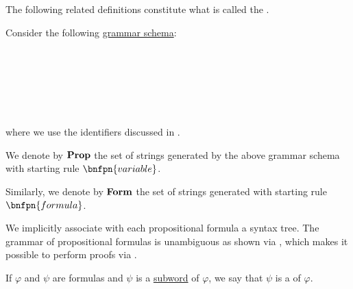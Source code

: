 \begin{definition}\label{def:propositional_syntax}\mimprovised
  The following related definitions constitute what is called the .

  \begin{thmenum}
     Consider the following \hyperref[rem:backus_normal_form]{grammar schema}:
    \begin{bnf*}
                 {} \\
               {\bnftsq{\( \synvee \)} \bnfor \bnftsq{\( \synwedge \)} \bnfor \bnftsq{\( \synimplies \)} \bnfor \bnftsq{\( \syniff \)}} \\
                  {\bnftsq{\( \syntop \)} \bnfor \bnftsq{\( \synbot \)} \bnfor} \\
       \\
       \\
    \end{bnf*}
    where we use the identifiers discussed in .

     We denote by \( \operatorname{\mathbf{Prop}} \) the set of strings generated by the above grammar schema with starting rule \( \bnfpn{variable} \).

     Similarly, we denote by \( \operatorname{\mathbf{Form}} \) the set of strings generated with starting rule \( \bnfpn{formula} \).

    We implicitly associate with each propositional formula a syntax tree. The grammar of propositional formulas is unambiguous as shown via , which makes it possible to perform proofs via .

     If \( \varphi \) and \( \psi \) are formulas and \( \psi \) is a \hyperref[def:formal_language/subword]{subword} of \( \varphi \), we say that \( \psi \) is a  of \( \varphi \).


\end{thmenum}
\end{definition}
